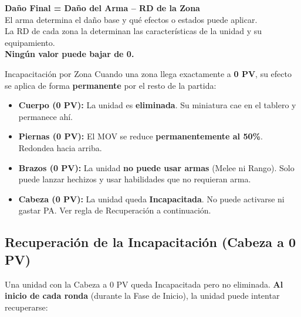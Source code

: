 \vspace{0.3cm}

\begin{tcolorbox}[colback=HammerRed!8, colframe=HammerRed]
\centering
\large \textbf{Daño Final = Daño del Arma -- RD de la Zona}\\[4pt]
\small El arma determina el daño base y qué efectos o estados puede aplicar.\\
La RD de cada zona la determinan las características de la unidad y su equipamiento.\\
\textbf{Ningún valor puede bajar de 0.}
\end{tcolorbox}

\begin{reglaespecial}{Incapacitación por Zona}
Cuando una zona llega exactamente a \textbf{0 PV}, su efecto se aplica de forma \textbf{permanente} por el resto de la partida:
\begin{itemize}
    \item \textbf{Cuerpo (0 PV):} La unidad es \textbf{eliminada}. Su miniatura cae en el tablero y permanece ahí.
    \item \textbf{Piernas (0 PV):} El MOV se reduce \textbf{permanentemente al 50\%}. Redondea hacia arriba.
    \item \textbf{Brazos (0 PV):} La unidad \textbf{no puede usar armas} (Melee ni Rango). Solo puede lanzar hechizos y usar habilidades que no requieran arma.
    \item \textbf{Cabeza (0 PV):} La unidad queda \textbf{Incapacitada}. No puede activarse ni gastar PA. Ver regla de Recuperación a continuación.
\end{itemize}
\end{reglaespecial}

\subsection*{Recuperación de la Incapacitación (Cabeza a 0 PV)}

Una unidad con la Cabeza a 0 PV queda Incapacitada pero no eliminada. \textbf{Al inicio de cada ronda} (durante la Fase de Inicio), la unidad puede intentar recuperarse:

